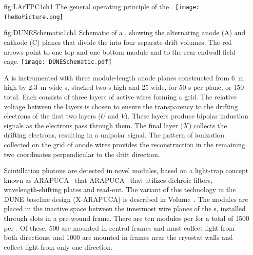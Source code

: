 \begin{dunefigure}{fig:LArTPC1ch1}
{The general operating principle of the  .}
\texttt{[image: TheBoPicture.png]} 
\end{dunefigure}

\begin{dunefigure}{fig:DUNESchematic1ch1}
{Schematic of a \nominalmodsize {}  , showing the alternating anode (A) and cathode (C) planes that divide the  into four separate drift volumes. The red arrows point to one top and one bottom  module and to the rear endwall field cage.}
\texttt{[image: DUNESchematic.pdf]}
\end{dunefigure}

A  is instrumented with three module-length anode planes constructed from \SI{6}{m} high by \SI{2.3}{m} wide s, stacked two s high and 25 wide, for 50 s per plane, or 150 total. Each  consists of three layers of active wires forming a grid. The relative voltage between the layers is chosen to ensure the transparency to the drifting electrons of the first two layers ($U$ and $V$). These layers produce bipolar induction signals as the electrons pass through them. The final layer ($X$) collects the drifting electrons, resulting in a unipolar signal. The pattern of ionization collected on the grid of anode wires provides the reconstruction in the remaining two coordinates perpendicular to the drift direction.


Scintillation photons are detected in 
novel  modules, based on  
a light-trap concept known as 
ARAPUCA~\cite{arapuca_jinst,arpkLNLS,Segreto:2018jdx} that   
ARAPUCA~\cite{arapuca_jinst,Segreto:2018jdx} that  
utilizes dichroic filters, wavelength-shifting plates and 
 read-out. The variant of this technology in 
the DUNE baseline design (X-ARAPUCA) is described in Volume~\volnumbersp{}.  
The  modules 
are placed in the inactive space between the 
innermost wire planes of the s, installed through 
slots in a pre-wound  frame. 
There are ten  modules per  for a total of 
\num{1500} per .  Of these, \num{500} are mounted in 
central  frames and must collect light from both 
directions, 
and \num{1000} are mounted in frames  near the %
cryostat walls and collect light from only one direction. 

